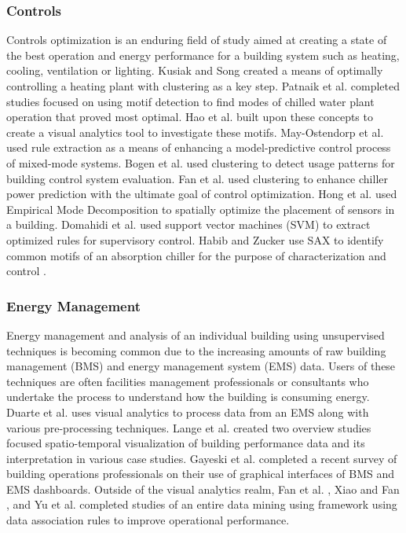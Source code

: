 \subsubsection{Controls}
Controls optimization is an enduring field of study aimed at creating a state of the best operation and energy performance for a building system such as heating, cooling, ventilation or lighting. Kusiak and Song \cite{kusiak_clustering-based_2008} created a means of optimally controlling a heating plant with clustering as a key step. Patnaik et al. \cite{patnaik_data_2010,patnaik_sustainable_2009} completed studies focused on using motif detection to find modes of chilled water plant operation that proved most optimal. Hao et al. \cite{hao_visualizing_2011} built upon these concepts to create a visual analytics tool to investigate these motifs. May-Ostendorp et al. \cite{may-ostendorp_model-predictive_2011,may-ostendorp_extraction_2013} used rule extraction as a means of enhancing a model-predictive control process of mixed-mode systems. Bogen et al. \cite{bogen_evaluating_2013} used clustering to detect usage patterns for building control system evaluation. Fan et al. \cite{fan_prediction_2013} used clustering to enhance chiller power prediction with the ultimate goal of control optimization. Hong et al. \cite{hong_towards_2013} used Empirical Mode Decomposition to spatially optimize the placement of sensors in a building. Domahidi et al. \cite{domahidi_learning_2014} used support vector machines (SVM) to extract optimized rules for supervisory control. Habib and Zucker use SAX to identify common motifs of an absorption chiller for the purpose of characterization and control \cite{habib_finding_2015}.

\subsubsection{Energy Management}
Energy management and analysis of an individual building using unsupervised techniques is becoming common due to the increasing amounts of raw building management (BMS) and energy management system (EMS) data. Users of these techniques are often facilities management professionals or consultants who undertake the process to understand how the building is consuming energy. Duarte et al. \cite{duarte_prioritizing_2011} uses visual analytics to process data from an EMS along with various pre-processing techniques. Lange et al. \cite{lange_energy_2012,lange_discovering_2013} created two overview studies focused spatio-temporal visualization of building performance data and its interpretation in various case studies. Gayeski et al. \cite{gayeski_data_2015} completed a recent survey of building operations professionals on their use of graphical interfaces of BMS and EMS dashboards. Outside of the visual analytics realm, Fan et al. \cite{fan_temporal_2015}, Xiao and Fan \cite{xiao_data_2014}, and Yu et al. \cite{yu_extracting_2013} completed studies of an entire data mining using framework using data association rules to improve operational performance.


